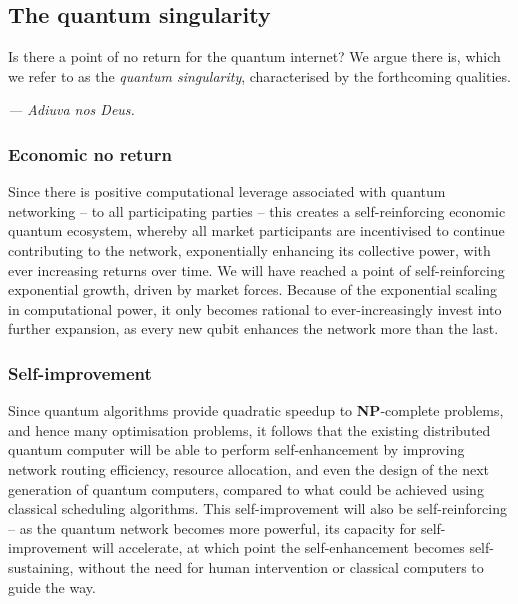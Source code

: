 %
%

\subsection{The quantum singularity} \label{sec:singularity} 

Is there a point of no return for the quantum internet? We argue there is, which we refer to as the \textit{quantum singularity}, characterised by the forthcoming qualities.

\textit{--- Adiuva nos Deus.}

%
%

\subsubsection{Economic no return}

Since there is positive computational leverage associated with quantum networking -- to all participating parties -- this creates a self-reinforcing economic quantum ecosystem, whereby all market participants are incentivised to continue contributing to the network, exponentially enhancing its collective power, with ever increasing returns over time. We will have reached a point of self-reinforcing exponential growth, driven by market forces. Because of the exponential scaling in computational power, it only becomes rational to ever-increasingly invest into further expansion, as every new qubit enhances the network more than the last.

%
%

\subsubsection{Self-improvement}

Since quantum algorithms provide quadratic speedup to \textbf{NP}-complete problems, and hence many optimisation problems, it follows that the existing distributed quantum computer will be able to perform self-enhancement by improving network routing efficiency, resource allocation, and even the design of the next generation of quantum computers, compared to what could be achieved using classical scheduling algorithms. This self-improvement will also be self-reinforcing -- as the quantum network becomes more powerful, its capacity for self-improvement will accelerate, at which point the self-enhancement becomes self-sustaining, without the need for human intervention or classical computers to guide the way.

